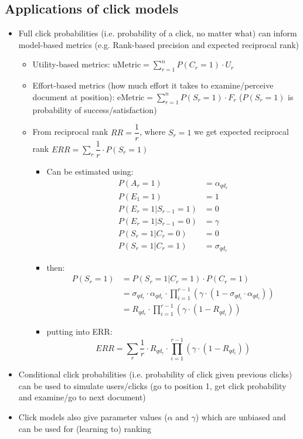 \subsection{Applications of click models}
\begin{itemize}
	\item Full click probabilities (i.e. probability of a click, no matter what) can inform model-based metrics (e.g. Rank-based precision and expected reciprocal rank)
	\begin{itemize}
		\item Utility-based metrics: $\mathrm{uMetric} = \sum_{r=1}^n P(C_r = 1) \cdot U_r$
		\item Effort-based metrics (how much effort it takes to examine/perceive document at position): $\mathrm{eMetric} = \sum_{r=1}^n P(S_r = 1) \cdot F_r$ ($P(S_r = 1)$ is probability of success/satisfaction)
		\item From reciprocal rank $RR = \dfrac{1}{r}$, where $S_r =1$ we get expected reciprocal rank $ERR = \sum_r \dfrac{1}{r} \cdot P(S_r =1)$
		\begin{itemize}
			\item Can be estimated using:
			\begin{align*}
				P(A_r = 1) &= \alpha_{qd_r} \\
				P(E_1 = 1 ) &= 1 \\
				P(E_r =1 | S_{r-1} = 1) &= 0 \\
				P(E_r =1 | S_{r-1} = 0) &= \gamma \\
				P(S_r = 1 | C_r = 0) &= 0 \\
				P(S_r = 1 | C_r = 1) &= \sigma_{qd_r}
			\end{align*}
			\item then:
			\begin{align*}
				P(S_r=1) &= P(S_r = 1 | C_r = 1) \cdot P(C_r = 1) \\
				&= \sigma_{qd_r} \cdot \alpha_{qd_r} \cdot \prod_{i=1}^{r-1} (\gamma \cdot (1 - \sigma_{qd_i} \cdot \alpha_{qd_i})) \\
				&= R_{qd_r} \cdot \prod_{i=1}^{r-1} (\gamma \cdot (1 - R_{qd_i}))
			\end{align*}
			\item putting into ERR:
			$$ ERR = \sum_r \dfrac{1}{r} \cdot R_{qd_r} \cdot \prod_{i=1}^{r-1} (\gamma \cdot (1 - R_{qd_i})) $$
		\end{itemize}
	\end{itemize}
	\item Conditional click probabilities (i.e. probability of click given previous clicks) can be used to simulate users/clicks (go to position 1, get click probability and examine/go to next document)
	\item Click models also give parameter values ($\alpha$ and $\gamma$) which are unbiased and can be used for (learning to) ranking
\end{itemize}